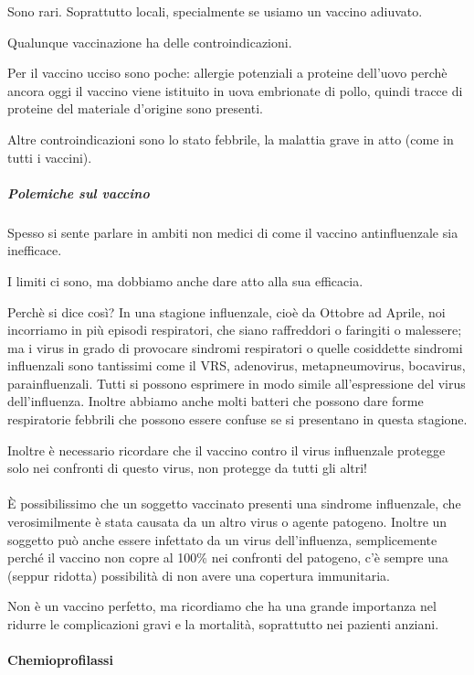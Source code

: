 Sono rari. Soprattutto locali, specialmente se usiamo un vaccino
adiuvato.

Qualunque vaccinazione ha delle controindicazioni.

Per il vaccino ucciso sono poche: allergie potenziali a proteine
dell'uovo perchè ancora oggi il vaccino viene istituito in uova
embrionate di pollo, quindi tracce di proteine del materiale d'origine
sono presenti.

Altre controindicazioni sono lo stato febbrile, la malattia grave in
atto (come in tutti i vaccini).

\subparagraph{Polemiche sul vaccino}


Spesso si sente parlare in ambiti non medici di come il vaccino
antinfluenzale sia inefficace.

I limiti ci sono, ma dobbiamo anche dare atto alla sua efficacia.

Perchè si dice così? In una stagione influenzale, cioè da Ottobre ad
Aprile, noi incorriamo in più episodi respiratori, che siano raffreddori
o faringiti o malessere; ma i virus in grado di provocare sindromi
respiratori o quelle cosiddette sindromi influenzali sono tantissimi
come il VRS, adenovirus, metapneumovirus, bocavirus, parainfluenzali.
Tutti si possono esprimere in modo simile all'espressione del virus
dell'influenza. Inoltre abbiamo anche molti batteri che possono dare
forme respiratorie febbrili che possono essere confuse se si presentano
in questa stagione.

Inoltre è necessario ricordare che il vaccino contro il virus
influenzale protegge solo nei confronti di questo virus, non protegge da
tutti gli altri!
\\\\
È possibilissimo che un soggetto vaccinato presenti una sindrome
influenzale, che verosimilmente è stata causata da un altro virus o
agente patogeno. Inoltre un soggetto può anche essere infettato da un
virus dell'influenza, semplicemente perché il vaccino non copre al 100\%
nei confronti del patogeno, c'è sempre una (seppur ridotta) possibilità
di non avere una copertura immunitaria.

Non è un vaccino perfetto, ma ricordiamo che ha una grande importanza
nel ridurre le complicazioni gravi e la mortalità, soprattutto nei
pazienti anziani.

\paragraph{ Chemioprofilassi}


